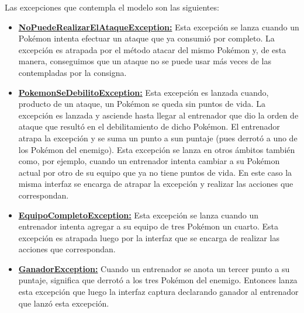 Las excepciones que contempla el modelo son las siguientes:
\begin{itemize}
  \item \underline{\textbf{NoPuedeRealizarElAtaqueException:}} Esta excepción se lanza cuando un Pokémon
  intenta efectuar un ataque que ya consumió por completo. La excepción es atrapada por el método atacar
  del mismo Pokémon y, de esta manera, conseguimos que un ataque no se puede usar más veces de las
  contempladas por la consigna.
  \item \underline{\textbf{PokemonSeDebilitoException:}} Esta excepción es lanzada cuando, producto de un
  ataque, un Pokémon se queda sin puntos de vida. La excepción es lanzada y asciende hasta llegar al
  entrenador que dio la orden de ataque que resultó en el debilitamiento de dicho Pokémon. El
  entrenador atrapa la excepción y se suma un punto a sun puntaje (pues derrotó a uno de los Pokémon
  del enemigo). Esta excepción se lanza en otros ámbitos también como, por ejemplo, cuando un entrenador
  intenta cambiar a su Pokémon actual por otro de su equipo que ya no tiene puntos de vida. En este caso
  la misma interfaz se encarga de atrapar la excepción y realizar las acciones que correspondan.
  \item \underline{\textbf{EquipoCompletoException:}} Esta excepción se lanza cuando un entrenador
  intenta agregar a su equipo de tres Pokémon un cuarto. Esta excepción es atrapada luego por la interfaz
  que se encarga de realizar las acciones que correspondan.
  \item \underline{\textbf{GanadorException:}} Cuando un entrenador se anota un tercer punto a su
  puntaje, significa que derrotó a los tres Pokémon del enemigo. Entonces lanza esta excepción que
  luego la interfaz captura declarando ganador al entrenador que lanzó esta excepción.
\end{itemize}
